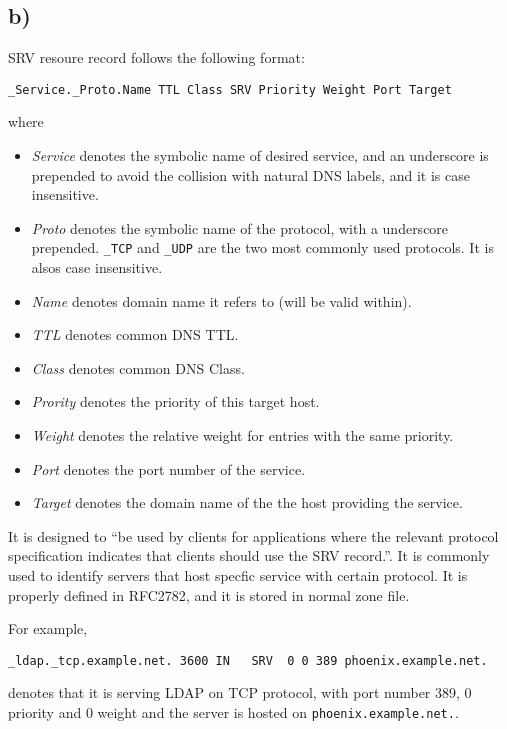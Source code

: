 \documentclass{article}
\begin{document}
\subsection*{b)}
\label{subsec:srv}
SRV resoure record follows the following format\autocite{RFC2782}:
\begin{verbatim}
_Service._Proto.Name TTL Class SRV Priority Weight Port Target
\end{verbatim}
where
\begin{itemize}
\item
  \emph{Service} denotes the symbolic name of desired service, and an underscore is
  prepended to avoid the collision with natural DNS labels, and it is case insensitive.
\item
  \emph{Proto} denotes the symbolic name of the protocol, with a underscore
  prepended. \verb+_TCP+ and \verb+_UDP+ are the two most commonly used
  protocols. It is alsos case insensitive.
\item
  \emph{Name} denotes domain name it refers to (will be valid within).
\item
  \emph{TTL} denotes common DNS TTL.
\item
  \emph{Class} denotes common DNS Class.
\item
  \emph{Prority} denotes the priority of this target host.
\item
  \emph{Weight} denotes the relative weight for entries with the same priority.
\item
  \emph{Port} denotes the port number of the service.
\item
  \emph{Target} denotes the domain name of the the host providing the service.


\end{itemize}

It is designed to ``be used by clients
   for applications where the relevant protocol specification indicates
   that clients should use the SRV record.''\autocite{RFC2782}. It is commonly used
   to identify servers that host specfic service with certain protocol. It is
   properly defined in RFC2782, and it is stored in normal zone file.


   For example,
\begin{verbatim}
_ldap._tcp.example.net. 3600 IN	  SRV  0 0 389 phoenix.example.net.
\end{verbatim}
   denotes that it is serving LDAP on TCP protocol, with port number 389, 0
   priority and 0 weight and the server is hosted on \verb+phoenix.example.net.+.
\end{document}
